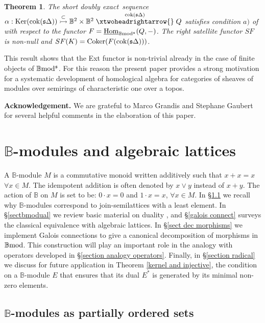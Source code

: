 \documentclass[12pt]{article}
\newtheorem{thm}{Theorem}[section]
\def\Homi{{\underline{\rm Hom}}}
\def\Ker{{\rm Ker}}
\def\coker{{\rm Coker}}
\def\scoker{{\rm cok}}
\def\B{{\mathbb B}}
\def\exxx{{doubly exact}~}
\def\yb{\mathfrak{s}}
\def\bmod{{\rm \B mod}}
\def\b2{{\rm \B mod^{\mathfrak s}}}
\begin{document}
 \begin{thm}\label{sequence alpha intro} The short \exxx sequence $\alpha:\Ker(\scoker(\yb\Delta))\stackrel{\subset}{\rightarrowtail} \B^2\times \B^2\stackrel{\scoker(\yb\Delta)}{\xtwoheadrightarrow{}}Q$ satisfies condition $a)$ of \cite{gra1} with respect to the functor $F=\Homi_\b2(Q,-)$.  	
 The right satellite functor $SF$  is non-null and $SF(K)=\coker(F(\scoker(\yb\Delta)))$.\end{thm}
This result shows that the Ext functor is non-trivial already in the case of finite objects of $\b2$. For this reason the present paper provides a strong motivation for a systematic development of homological algebra for categories of sheaves of modules over semirings of characteristic one over a topos. 
 
\vspace{0.1in}
{\bf{Acknowledgement.}}
 We are grateful to Marco Grandis and Stephane Gaubert for several helpful comments in the elaboration of this paper.

\section{$\B$-modules and algebraic lattices}\label{sect bmodules}


A $\B$-module $M$ is a commutative monoid written additively such that $x+x=x$ $\forall x\in M$. The idempotent addition is often denoted by $x\vee y$ instead of $x+y$. The action of $\B$ on $M$ is set to be: $0\cdot x=0$  and $1\cdot x=x$, $\forall x\in M$. In \S\ref{sect bmodules1} we recall why $\B$-modules correspond to join-semilattices with a least element.  In \S\ref{sectbmodual} we review basic material on duality \cite{Cohen}, and \S\ref{galois connect} surveys the classical equivalence with algebraic lattices. In \S\ref{sect dec morphisms} we implement Galois connections \cite{Cohen} to  give a canonical decomposition of morphisms in $\bmod$. This construction will play an important role in the analogy with operators developed in \S\ref{section analogy operators}.  Finally, in \S\ref{section radical} we discuss for future application in Theorem \ref{kernel and injective}, the condition on a $\B$-module $E$  that ensures that its dual $E^*$ is generated by its minimal non-zero elements.


\subsection{$\B$-modules as partially ordered sets}\label{sect bmodules1}
 
\end{document}
